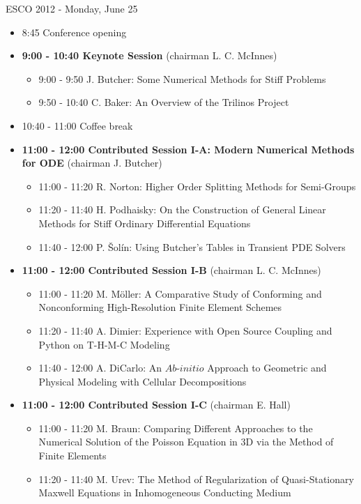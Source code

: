 \documentclass[10pt, A4]{article}%
\begin{document}
\centerline{\huge ESCO 2012 - Monday, June 25}
\vspace{4mm}

\begin{itemize}    
  \item 8:45 Conference opening
  \item {\bf 9:00 - 10:40 Keynote Session} (chairman L. C. McInnes) 
  \begin{itemize}
    \item 9:00 - 9:50 J. Butcher: Some Numerical Methods for Stiff Problems
    \item 9:50 - 10:40 C. Baker: An Overview of the Trilinos Project
  \end{itemize}
  \item 10:40 - 11:00 Coffee break
  \item {\bf 11:00 - 12:00 Contributed Session I-A: Modern Numerical Methods for ODE}  (chairman J. Butcher)
  \begin{itemize}
    \item 11:00 - 11:20 R. Norton: Higher Order Splitting Methods for Semi-Groups
    \item 11:20 - 11:40 H. Podhaisky: On the Construction of General Linear Methods for Stiff Ordinary Differential Equations
    \item 11:40 - 12:00 P. \v{S}ol\'{i}n: Using Butcher's Tables in Transient PDE Solvers
  \end{itemize}
  \item {\bf 11:00 - 12:00 Contributed Session I-B} (chairman L. C. McInnes) 
  \begin{itemize}
    \item 11:00 - 11:20 M. M\"{o}ller: A Comparative Study of Conforming and Nonconforming High-Resolution Finite Element Schemes
    \item 11:20 - 11:40 A. Dimier: Experience with Open Source Coupling and Python on T-H-M-C Modeling
    \item 11:40 - 12:00 A. DiCarlo: An $Ab$-$initio$ Approach to Geometric and Physical Modeling with Cellular Decompositions 
  \end{itemize}
  \item {\bf 11:00 - 12:00 Contributed Session I-C} (chairman E. Hall) 
  \begin{itemize}
	\item 11:00 - 11:20 M. Braun: Comparing Different Approaches to the Numerical Solution of the Poisson Equation in 3D via the Method of Finite Elements
    \item 11:20 - 11:40 M. Urev: The Method of Regularization of Quasi-Stationary Maxwell Equations in Inhomogeneous Conducting Medium

\end{itemize}
\end{itemize}
\end{document}
